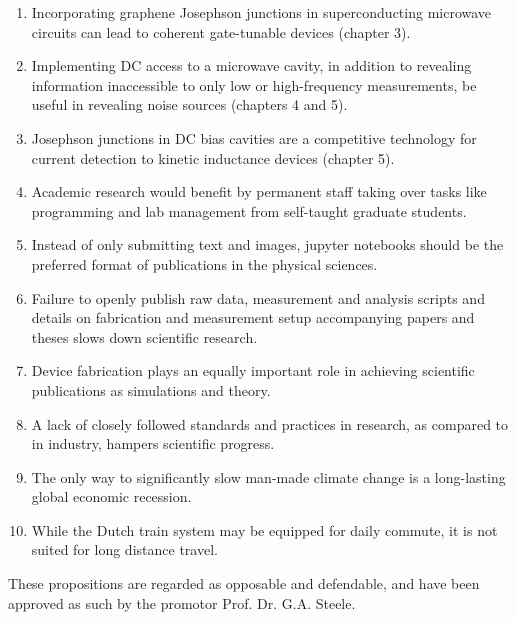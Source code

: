 \documentclass{dissertation-edit}
\begin{document}
\begin{enumerate}

\item Incorporating graphene Josephson junctions in superconducting microwave circuits can lead to coherent gate-tunable devices (chapter 3).
%
\item Implementing DC access to a microwave cavity, in addition to revealing information inaccessible to only low or high-frequency measurements, be useful in revealing noise sources (chapters 4 and 5).
%
\item Josephson junctions in DC bias cavities are a competitive technology for current detection to kinetic inductance devices (chapter 5).
%
\item Academic research would benefit by permanent staff taking over tasks like programming and lab management from self-taught graduate students.
%
\item Instead of only submitting text and images, jupyter notebooks should be the preferred format of publications in the physical sciences.
%
\item Failure to openly publish raw data, measurement and analysis scripts and details on fabrication and measurement setup accompanying papers and theses slows down scientific research.
%
\item Device fabrication plays an equally important role in achieving scientific publications as simulations and theory.
%
\item A lack of closely followed standards and practices in research, as compared to in industry, hampers scientific progress.
%
\item The only way to significantly slow man-made climate change is a long-lasting global economic recession.
%
\item While the Dutch train system may be equipped for daily commute, it is not suited for long distance travel.

\end{enumerate}

\bigskip
\bigskip

\begin{center}
These propositions are regarded as opposable and defendable, and have been approved as such by the promotor Prof. Dr. G.A. Steele.
\end{center}
\end{document}
